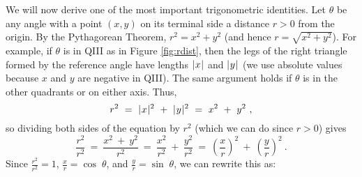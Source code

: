 \begin{center}\end{center}

\piccaption[]{\label{fig:rdist}}
We will now derive one of the most important trigonometric identities. Let $\theta$ be any angle with
a point $(x,y)$ on its terminal side a distance $r>0$ from the origin. By the Pythagorean Theorem,
$r^2 = x^2 + y^2$ (and hence $r=\sqrt{x^2 + y^2}$).
For example, if $\theta$ is in QIII as in Figure \ref{fig:rdist}, then the legs
of the right triangle formed by the reference angle have lengths $\lvert\mspace{1mu}x\mspace{1mu}\rvert$ and $\lvert\mspace{1mu}y\mspace{1mu}\rvert$ (we
use absolute values because $x$ and $y$ are negative in QIII). The same argument holds if $\theta$
is in the other quadrants or on either axis. Thus,
\begin{displaymath}
 r^2 ~=~ \lvert\mspace{1mu}x\mspace{1mu}\rvert^2 ~+~ \lvert\mspace{1mu}y\mspace{1mu}\rvert^2 ~=~ x^2 ~+~ y^2 ~,
\end{displaymath}
so dividing both sides of the equation by $r^2$ (which we can do since $r>0$) gives
\begin{displaymath}
 \frac{r^2}{r^2} ~=~ \frac{x^2 ~+~ y^2}{r^2} ~=~ \frac{x^2}{r^2} ~+~ \frac{y^2}{r^2} ~=~
  \left(\frac{x}{r}\right)^2 ~+~ \left(\frac{y}{r}\right)^2 ~.
\end{displaymath}
Since $\frac{r^2}{r^2} = 1$, $\frac{x}{r} = \cos\;\theta$, and $\frac{y}{r} = \sin\;\theta$,
we can rewrite this as:

